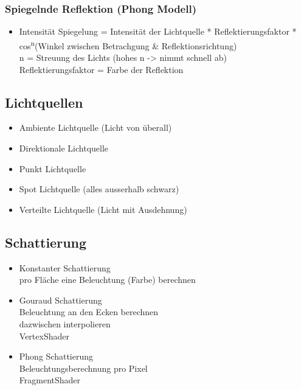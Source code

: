 \subsubsection{Spiegelnde Reflektion (Phong Modell)}

\begin{itemize}
	\item Intensität Spiegelung = Intensität der Lichtquelle * Reflektierungsfaktor * cos\textsuperscript{n}(Winkel zwischen Betrachgung \& Reflektionsrichtung) \\
	n = Streuung des Lichts (hohes n -> nimmt schnell ab) \\
	Reflektierungsfaktor = Farbe der Reflektion
\end{itemize}

\subsection{Lichtquellen}

\begin{itemize}
	\item Ambiente Lichtquelle (Licht von überall) 
	\item Direktionale Lichtquelle
	\item Punkt Lichtquelle
	\item Spot Lichtquelle (alles ausserhalb schwarz)
	\item Verteilte Lichtquelle (Licht mit Ausdehnung)
\end{itemize}

\subsection{Schattierung}

\begin{itemize}
	\item Konstanter Schattierung \\
	pro Fläche eine Beleuchtung (Farbe) berechnen

	\item Gouraud Schattierung \\
	Beleuchtung an den Ecken berechnen \\
	dazwischen interpolieren \\
	VertexShader

	\item Phong Schattierung \\
	Beleuchtungsberechnung pro Pixel \\
	FragmentShader
\end{itemize}